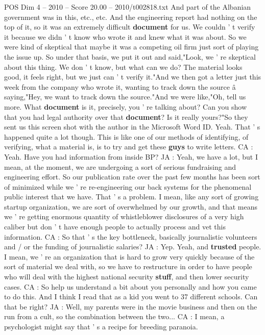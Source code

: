 \begin{textsample}{POS Dim 4 – 2010 – Score 20.00 – 2010/t002818.txt}
And part of the Albanian government was in this, etc., etc.
And the engineering report had nothing on the top of it, so it was an extremely difficult \textbf{document} for us.
We couldn ' t verify it because we didn ' t know who wrote it and knew what it was about.
So we were kind of skeptical that maybe it was a competing oil firm just sort of playing the issue up.
So under that basis, we put it out and said,"Look, we ' re skeptical about this thing.
We don ' t know, but what can we do?
The material looks good, it feels right, but we just can ' t verify it."And we then got a letter just this week from the company who wrote it, wanting to track down the source â saying,"Hey, we want to track down the source."And we were like,"Oh, tell us more.
What \textbf{document} is it, precisely, you ' re talking about?
Can you show that you had legal authority over that \textbf{document}?
Is it really yours?"So they sent us this screen shot with the author in the Microsoft Word ID.
Yeah.
That ' s happened quite a lot though.
This is like one of our methods of identifying, of verifying, what a material is, is to try and get these \textbf{guys} to write letters.
CA : Yeah.
Have you had information from inside BP?
JA : Yeah, we have a lot, but I mean, at the moment, we are undergoing a sort of serious fundraising and engineering effort.
So our publication rate over the past few months has been sort of minimized while we ' re re-engineering our back systems for the phenomenal public interest that we have.
That ' s a problem.
I mean, like any sort of growing startup organization, we are sort of overwhelmed by our growth, and that means we ' re getting enormous quantity of whistleblower disclosures of a very high caliber but don ' t have enough people to actually process and vet this information.
CA : So that ' s the key bottleneck, basically journalistic volunteers and / or the funding of journalistic salaries?
JA : Yep.
Yeah, and \textbf{trusted} people.
I mean, we ' re an organization that is hard to grow very quickly because of the sort of material we deal with, so we have to restructure in order to have people who will deal with the highest national security \textbf{stuff}, and then lower security cases.
CA : So help us understand a bit about you personally and how you came to do this.
And I think I read that as a kid you went to 37 different schools.
Can that be right?
JA : Well, my parents were in the movie business and then on the run from a cult, so the combination between the two...
CA : I mean, a psychologist might say that ' s a recipe for breeding paranoia.

\end{textsample}
